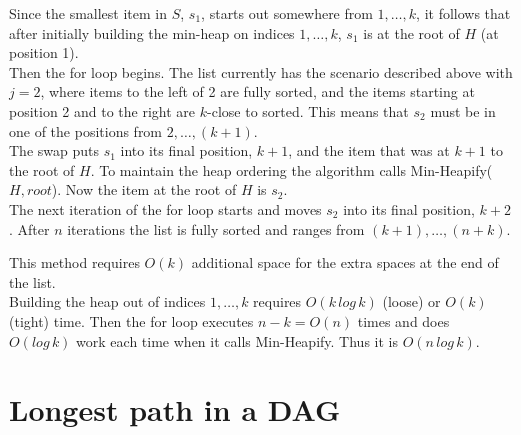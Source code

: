 \documentclass[11pt]{article}
\begin{document}
\begin{itemize}
{Since the smallest item in $S$, $s_1$, starts out somewhere from $1,\dots,k$, it follows that after initially building the min-heap on indices $1,\dots,k$, $s_1$ is at the root of $H$ (at position 1). \\
Then the for loop begins. The list currently has the scenario described above with $j=2$, where items to the left of 2 are fully sorted, and the items starting at position 2 and to the right are $k$-close to sorted. This means that $s_2$ must be in one of the positions from $2,\dots,(k+1)$. \\
The swap puts $s_1$ into its final position, $k+1$, and the item that was at $k+1$ to the root of $H$. To maintain the heap ordering the algorithm calls Min-Heapify($H,root$). Now the item at the root of $H$ is $s_2$. \\
The next iteration of the for loop starts and moves $s_2$ into its final position, $k+2$. After $n$ iterations the list is fully sorted and ranges from $(k+1),\dots,(n+k)$.

This method requires $O(k)$ additional space for the extra spaces at the end of the list. \\
Building the heap out of indices $1,\dots,k$ requires $O(k\,log\,k)$ (loose) or $O(k)$ (tight) time. Then the for loop executes $n-k = O(n)$ times and does $O(log\,k)$ work each time when it calls Min-Heapify. Thus it is $O(n\,log\,k)$.


}

\end{itemize}

\section{Longest path in a DAG}
\end{document}
